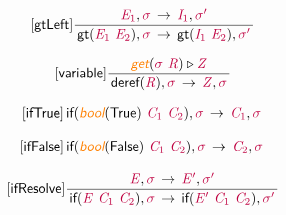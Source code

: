 \documentclass[11pt]{book}
\newcommand{\artVariable}[1]{\mbox{\color{purple}\em #1\/}}
\newcommand{\artConstructor}[1]{\mbox{\sf #1}}
\newcommand{\artSpecial}[1]{\mbox{\color{orange}\sf\em #1}}
\begin{document}
\begin{equation}
\tag*{[\artConstructor{\sf gtLeft}]}
\begin{split}\frac{\, \artVariable{E$_{1}$}, \artVariable{$\sigma$}\, \rightarrow \, \artVariable{I$_{1}$}, \artVariable{$\sigma$\/$^\prime$}\, }{\, \artConstructor{\sf gt}(\artVariable{E$_{1}$}\ \artVariable{E$_{2}$}), \artVariable{$\sigma$}\, \rightarrow \, \artConstructor{\sf gt}(\artVariable{I$_{1}$}\ \artVariable{E$_{2}$}), \artVariable{$\sigma$\/$^\prime$}\, }
\end{split}
\end{equation}

\begin{equation}
\tag*{[\artConstructor{\sf variable}]}
\begin{split}\frac{ \artSpecial{get}(\artVariable{$\sigma$}\ \artVariable{R})\triangleright \artVariable{Z} }{\, \artConstructor{\sf deref}(\artVariable{R}), \artVariable{$\sigma$}\, \rightarrow \, \artVariable{Z}, \artVariable{$\sigma$}\, }
\end{split}
\end{equation}

\begin{equation}
\tag*{[\artConstructor{\sf ifTrue}]}
\begin{split}\, \artConstructor{\sf if}(\artSpecial{bool}(\artConstructor{\sf True})\ \artVariable{C$_{1}$}\ \artVariable{C$_{2}$}), \artVariable{$\sigma$}\, \rightarrow \, \artVariable{C$_{1}$}, \artVariable{$\sigma$}\, 
\end{split}
\end{equation}

\begin{equation}
\tag*{[\artConstructor{\sf ifFalse}]}
\begin{split}\, \artConstructor{\sf if}(\artSpecial{bool}(\artConstructor{\sf False})\ \artVariable{C$_{1}$}\ \artVariable{C$_{2}$}), \artVariable{$\sigma$}\, \rightarrow \, \artVariable{C$_{2}$}, \artVariable{$\sigma$}\, 
\end{split}
\end{equation}

\begin{equation}
\tag*{[\artConstructor{\sf ifResolve}]}
\begin{split}\frac{\, \artVariable{E}, \artVariable{$\sigma$}\, \rightarrow \, \artVariable{E\/$^\prime$}, \artVariable{$\sigma$\/$^\prime$}\, }{\, \artConstructor{\sf if}(\artVariable{E}\ \artVariable{C$_{1}$}\ \artVariable{C$_{2}$}), \artVariable{$\sigma$}\, \rightarrow \, \artConstructor{\sf if}(\artVariable{E\/$^\prime$}\ \artVariable{C$_{1}$}\ \artVariable{C$_{2}$}), \artVariable{$\sigma$\/$^\prime$}\, }
\end{split}
\end{equation}
\end{document}
